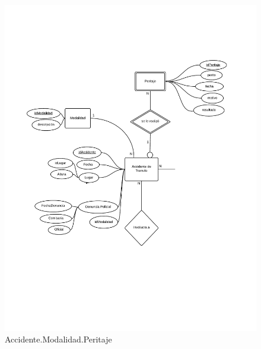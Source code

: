 \begin{figure}
  \begin{center}
    \includegraphics[scale=0.80]{diagramas/2-1.pdf}
    \caption{Accidente.Modalidad.Peritaje}
  \end{center}
\end{figure}

